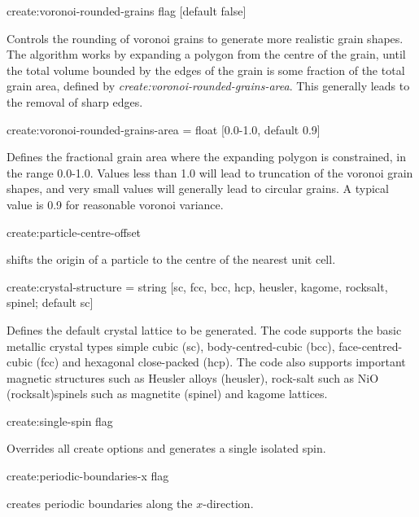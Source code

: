 {\zicf create:voronoi-rounded-grains flag [default false]} Controls the rounding of voronoi grains to generate more realistic grain shapes. The algorithm works by expanding a polygon from the centre of the grain, until the total volume bounded by the edges of the grain is some fraction of the total grain area, defined by \textit{create:voronoi-rounded-grains-area}. This generally leads to the removal of sharp edges. \\ \par

{\zicf create:voronoi-rounded-grains-area = float [0.0-1.0, default 0.9]} Defines the fractional grain area where the expanding polygon is constrained, in the range 0.0-1.0. Values less than 1.0 will lead to truncation of the voronoi grain shapes, and very small values will generally lead to circular grains. A typical value is 0.9 for reasonable voronoi variance.\\ \par

{\zicf create:particle-centre-offset} shifts the origin of a particle to the centre of the nearest unit cell.\\ \par

{\zicf create:crystal-structure = string [sc, fcc, bcc, hcp, heusler, kagome, rocksalt, spinel; default sc]}
Defines the default crystal lattice to be generated. The code supports the basic metallic crystal types
simple cubic (sc), body-centred-cubic (bcc), face-centred-cubic (fcc) and hexagonal close-packed (hcp).
The code also supports important magnetic structures such as Heusler alloys (heusler), rock-salt such as
NiO (rocksalt)spinels such as magnetite (spinel) and kagome lattices. \\ \par

{\zicf create:single-spin flag} Overrides all create options and generates a single isolated spin.\\ \par

{\zicf create:periodic-boundaries-x flag} creates periodic boundaries along the $x$-direction.\\ \par

